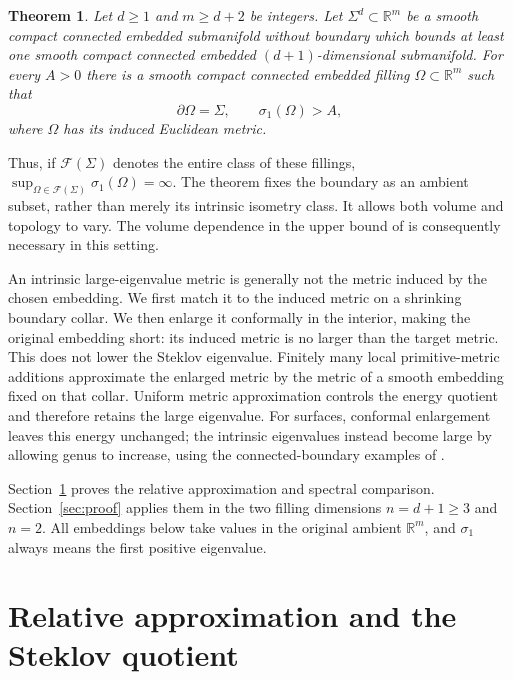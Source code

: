 \documentclass[11pt]{article}
\newtheorem{theorem}{Theorem}[section]
\theoremstyle{remark}
\newcommand{\R}{\mathbb R}
\begin{document}
\begin{theorem}\label{thm:main}
Let $d\geq1$ and $m\geq d+2$ be integers. Let
$\Sigma^d\subset\R^m$ be a smooth compact connected embedded submanifold
without boundary which bounds at least one smooth compact connected
embedded $(d+1)$-dimensional submanifold. For every $A>0$ there is a
smooth compact connected embedded filling $\Omega\subset\R^m$ such that
\[
 \partial\Omega=\Sigma,\qquad \sigma_1(\Omega)>A,
\]
where $\Omega$ has its induced Euclidean metric.
\end{theorem}

Thus, if $\mathcal F(\Sigma)$ denotes the entire class of these fillings,
$\sup_{\Omega\in\mathcal F(\Sigma)}\sigma_1(\Omega)=\infty$.
The theorem fixes the boundary as an ambient subset, rather than merely
its intrinsic isometry class. It allows both volume and topology to vary.
The volume dependence in the upper bound of \cite{CGG} is consequently
necessary in this setting.

An intrinsic large-eigenvalue metric is generally not the metric induced
by the chosen embedding. We first match it to the induced metric on a
shrinking boundary collar. We then enlarge it conformally in the interior,
making the original embedding short: its induced metric is no larger
than the target metric. This does not lower the Steklov eigenvalue.
Finitely many local primitive-metric additions approximate
the enlarged metric by the metric of a smooth embedding fixed on that
collar. Uniform metric approximation controls the energy quotient and
therefore retains the large eigenvalue. For surfaces, conformal
enlargement leaves this energy unchanged; the intrinsic eigenvalues
instead become large by allowing genus to increase, using the
connected-boundary examples of \cite{CGR}.

Section~\ref{sec:relative} proves the relative approximation and spectral
comparison. Section~\ref{sec:proof} applies them in the two filling
dimensions $n=d+1\geq3$ and $n=2$. All embeddings below take values in
the original ambient $\R^m$, and $\sigma_1$ always means the first
positive eigenvalue.

\section{Relative approximation and the Steklov quotient}\label{sec:relative}
\end{document}
